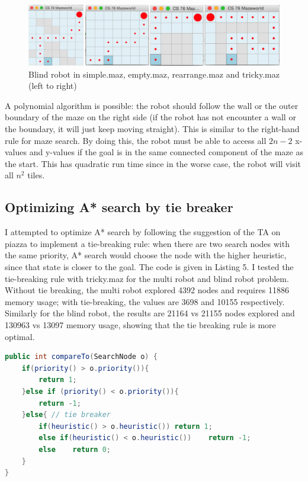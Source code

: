 \documentclass[9.5pt]{extarticle}
\begin{document}
\begin{figure}[H]
\centering
\includegraphics[scale=0.5]{together_blind.png}
\caption{Blind robot in simple.maz, empty.maz, rearrange.maz and tricky.maz (left to right) }
\label{Figure 5}
\end{figure}

A polynomial algorithm is possible: the robot should follow the wall or the outer boundary of the maze on the right side (if the robot has not encounter a wall or the boundary, it will just keep moving straight). This is similar to the right-hand rule for maze search. By doing this, the robot must be able to access all $2n-2$ x-values and y-values if the goal is in the same connected component of the maze as the start. This has quadratic run time since in the worse case, the robot will visit all $n^2$ tiles.

\subsection{Optimizing A* search by tie breaker}

I attempted to optimize A* search by following the suggestion of the TA on piazza to implement a tie-breaking rule: when there are two search nodes with the same priority, A* search would choose the node with the higher heuristic, since that state is closer to the goal. The code is given in Listing 5. I tested the tie-breaking rule with tricky.maz for the multi robot and blind robot problem. Without tie breaking, the multi robot explored 4392 nodes and requires 11886 memory usage; with tie-breaking, the values are 3698 and 10155 respectively. Similarly for the blind robot, the results are 21164 vs 21155 nodes explored and 130963 vs 13097 memory usage, showing that the tie breaking rule is more optimal.

\begin{lstlisting}[language=java,caption={Output for A* search of blind robot model for tricky.maz}]
public int compareTo(SearchNode o) {
	if(priority() > o.priority()){ 
		return 1;
	}else if (priority() < o.priority()){
		return -1;
	}else{ // tie breaker
		if(heuristic() > o.heuristic())	return 1;
		else if(heuristic() < o.heuristic())	return -1;
		else	return 0;
	}
}
\end{lstlisting}
\end{document}
